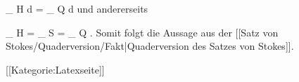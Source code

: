 {{\mavergleichskettedisp
{\vergleichskette
{
\int_{ H  }  d\omega
}
{ =} {
\int_{ Q  }  d\omega
}
{ } {
}
{ } {
}
{ } {
}
}
{}{}{}
und andererseits

\mavergleichskettedisp
{\vergleichskette
{
\int_{  \partial H  }   \omega
}
{ =} {
\int_{  S  }   \omega
}
{ =} {
\int_{  \partial Q  }   \omega
}
{ } {
}
{ } {
}
}
{}{}{.}
Somit folgt die Aussage
aus der [[Satz von Stokes/Quaderversion/Fakt|Quaderversion des Satzes von Stokes]].}
{}

 }
 [[Kategorie:Latexseite]]
